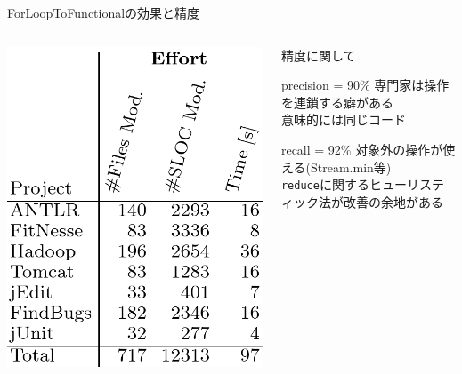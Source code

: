 \begin{frame}{ForLoopToFunctionalの効果と精度}
  \begin{columns}
    \begin{column}{0.4\textwidth}
\includegraphics[width=\textwidth,height=.8\textheight,keepaspectratio]{foreffort}
\end{column}
\begin{column}{0.6\textwidth}
  精度に関して
  \begin{block}{precision = 90\%}
  専門家は操作を連鎖する癖がある\\
  意味的には同じコード
  \end{block}

  \begin{block}{recall = 92\%}
  対象外の操作が使える(Stream.min等) \\
  \texttt{reduce}に関するヒューリスティック法が改善の余地がある
  \end{block}
\end{column}
\end{columns}
\end{frame}
